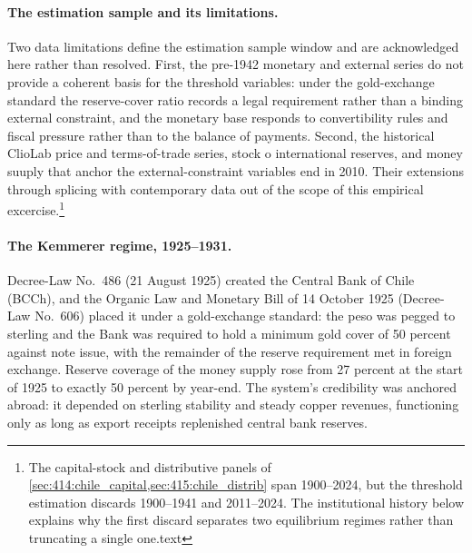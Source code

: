 \paragraph{The estimation sample and its limitations.}
 Two data limitations define the estimation sample window and are acknowledged here rather than resolved. First, the pre-1942 monetary and external series do not provide a coherent basis for the threshold variables: under the gold-exchange standard the reserve-cover ratio records a legal requirement rather than a binding external constraint, and the monetary base responds to convertibility rules and fiscal pressure rather than to the balance of payments. Second, the historical ClioLab price and terms-of-trade series, stock o international reserves, and money suuply that anchor the external-constraint variables end in 2010. Their extensions through splicing with contemporary data out of the scope of this empirical excercise.\footnote{The capital-stock and distributive panels of \cref{sec:414:chile_capital,sec:415:chile_distrib} span 1900--2024, but the threshold estimation discards 1900--1941 and 2011--2024. The institutional history below explains why the first discard separates two equilibrium regimes rather than truncating a single one.text}


\paragraph{The Kemmerer regime, 1925--1931.}
Decree-Law No.~486 (21 August 1925) created the Central Bank of Chile (BCCh), and the Organic Law and Monetary Bill of 14 October 1925 (Decree-Law No.~606) placed it under a gold-exchange standard: the peso was pegged to sterling and the Bank was required to hold a minimum gold cover of 50 percent against note issue, with the remainder of the reserve requirement met in foreign exchange. Reserve coverage of the money supply rose from 27 percent at the start of 1925 to exactly 50 percent by year-end. The system's credibility was anchored abroad: it depended on sterling stability and steady copper revenues, functioning only as long as export receipts replenished central bank reserves.

